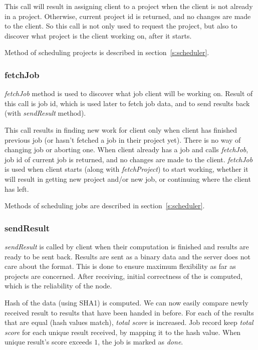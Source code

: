 This call will result in assigning client to a project when the client is not already in a project. Otherwise, current project id is returned, and no changes are made to the client. So this call is not only used to request the project, but also to discover what project is the client working on, after it starts.

Method of scheduling projects is described in section~\ref{s:scheduler}.

\subsubsection*{fetchJob}

\emph{fetchJob} method is used to discover what job client will be working on. Result of this call is job id, which is used later to fetch job data, and to send results back (with \emph{sendResult} method).

This call results in finding new work for client only when client has finished previous job (or hasn't fetched a job in their project yet). There is no way of changing job or aborting one. When client already has a job and calls \emph{fetchJob}, job id of current job is returned, and no changes are made to the client. \emph{fetchJob} is used when client starts (along with \emph{fetchProject}) to start working, whether it will result in getting new project and/or new job, or continuing where the client has left.

Methods of scheduling jobs are described in section~\ref{s:scheduler}.

\subsubsection*{sendResult}

\emph{sendResult} is called by client when their computation is finished and results are ready to be sent back. Results are sent as a binary data and the server does not care about the format. This is done to ensure maximum flexibility as far as projects are concerned. After receiving, initial correctness of the is computed, which is the reliability of the node. 

Hash of the data (using SHA1) is computed. We can now easily compare newly received result to results that have been handed in before. For each of the results that are equal (hash values match), \emph{total score} is increased. Job record keep \emph{total score} for each unique result received, by mapping it to the hash value. When unique result's score exceeds $1$, the job is marked as \emph{done}.

